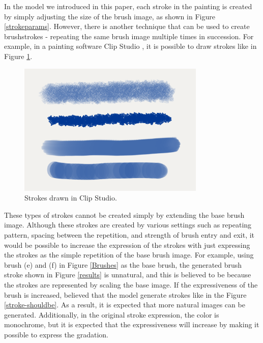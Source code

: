 In the model we introduced in this paper, each stroke in the painting is created 
by simply adjusting the size of the brush image, as shown in Figure \ref{strokeparams}.
However, there is another technique that can be used to create brushstrokes 
- repeating the same brush image multiple times in succession.
For example, in a painting software Clip Studio \cite{clipstudio}, it is 
possible to draw strokes like in Figure \ref{goodstroke}.
\begin{figure}[h]
    \centering
    \includegraphics[width=63truemm]{resources/6_discussions/strokes-clipstudio.png}
    \caption{
        Strokes drawn in Clip Studio.
    }
    \label{goodstroke}
\end{figure}
\newline
These types of strokes cannot be created simply by extending the base brush 
image. Although these strokes are created by various settings such as repeating 
pattern, spacing between the repetition, and strength of brush entry and exit, 
it would be possible to increase the expression of the strokes with just 
expressing the strokes as the simple repetition of the base brush image.
For example, using brush (e) and (f) in Figure \ref{Brushes} as the base brush, the 
generated brush stroke shown in Figure \ref{results} is unnatural, and this is 
believed to be because the strokes are represented by scaling the base image. 
If the expressiveness of the brush is increased, believed that the model generate 
strokes like in the Figure \ref{stroke-shouldbe}. As a result, it is expected 
that more natural images can be generated. 
Additionally, in the original stroke expression, the color is monochrome, 
but it is expected that the expressiveness will increase by making it possible 
to express the gradation.

